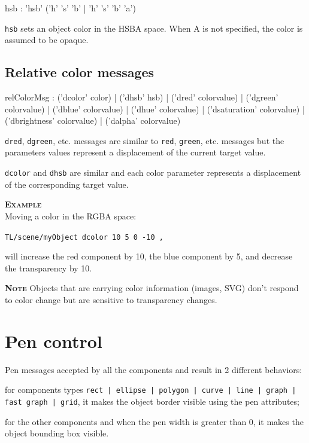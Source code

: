 \documentclass[a4paper,twoside]{report}
\newcommand{\sublevel}[1]	{\section{#1}}
\newcommand{\subsublevel}[1]	{\subsection{#1}}
\newcommand{\OSC}[1]		{\texttt{#1}}
\newcommand{\example}		{\textbf{\hspace{-1.5cm}\textbf{\textsc{Example }}}}
\newcommand{\note}	[1]		{\vspace{2mm}\textbf{\hspace{-0.9cm}\textbf{\textsc{Note #1}}}}
\let\olditemize\itemize
\let\oldenditemize\enditemize
\renewenvironment{itemize} 	{\olditemize \setlength{\itemsep}{1mm}}{\oldenditemize}
\newcommand{\sample}	[1]			{\vspace{-2mm}\begin{center}\colorbox{mygrey}{
								\begin{minipage}[t]{0.9\columnwidth} 
								{\small \texttt{#1}}
								\end{minipage}}\end{center}}
\newcommand{\sampleindent}	{ \hspace{0.5cm} }
\begin{document}
\begin{rail}
hsb :		'hsb' ('h' 's' 'b' | 'h' 's' 'b' 'a') 
\end{rail}

\OSC{hsb} sets an object color in the HSBA space. 
When A is not specified, the color is assumed to be opaque. 



\subsublevel{Relative color messages}
\label{relcolormsg}

\begin{rail}
relColorMsg :  
		 	('dcolor' color) 
		| 	('dhsb' hsb) 
		| 	('dred' colorvalue) 
		| 	('dgreen' colorvalue) 
		| 	('dblue' colorvalue) 
		| 	('dhue' colorvalue) 
		| 	('dsaturation' colorvalue) 
		| 	('dbrightness' colorvalue) 
		| 	('dalpha' colorvalue) 
\end{rail}

\begin{itemize}
\item \OSC{dred}, \OSC{dgreen}, etc. messages are similar to \OSC{red}, \OSC{green}, etc. messages but the parameters values represent a displacement of the current target value.
\item \OSC{dcolor} and \OSC{dhsb} are similar and each color parameter represents a displacement of the corresponding target value.
\end{itemize}

\example \\
Moving a color in the RGBA space:
\sample{TL/scene/myObject dcolor 10 5 0 -10 ,}
\sampleindent will increase the red component by 10, the blue component by 5, and decrease the transparency by 10.

\note{} Objects that are carrying color information (images, SVG) don't respond to color change but are sensitive to transparency changes.


\sublevel{Pen control}

Pen messages accepted by all the components and result in 2 different behaviors:
\begin{itemize}
\item for components types \OSC{rect | ellipse | polygon | curve | line | graph | fast graph | grid}, it makes the object border visible using the pen attributes;
\item for the other components and when the pen width is greater than 0, it makes the object bounding box visible.
\end{itemize}
\end{document}
